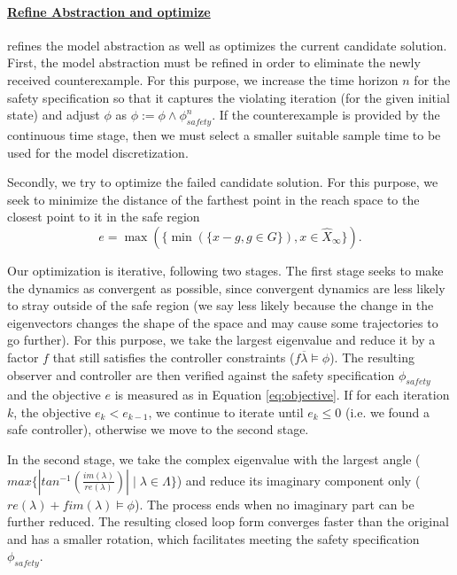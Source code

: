 \documentclass[sigconf]{llncs}
\renewcommand{\vec}[1]{{#1}}
\begin{document}
\paragraph{\underline{{\sc Refine Abstraction and optimize}}} refines the
model abstraction as well as optimizes the current candidate
solution.
%
First, the model abstraction must be refined in order to eliminate
the newly received counterexample. For this purpose,
we increase the time horizon $n$ for the
safety specification so that it captures the violating iteration
(for the given initial state) and adjust $\phi$ as 
$\phi := \phi \wedge \phi_\mathit{safety}^n$.
If the counterexample is provided by the {\sc continuous time} stage,
then we must select a smaller suitable sample time to be used
for the model discretization.


Secondly, we try to optimize the failed candidate solution.
For this purpose, we seek to minimize the distance of the farthest point in the
reach space to the closest point to it in the safe region
\begin{equation}
e = \max(\{\min(\{\vec{x}-\vec{g}, \vec{g}\in G\}), \vec{x} \in \hat{X}_\infty \}).
\label{eq:objective}
\end{equation}

Our optimization is iterative, following two stages.  The first stage
seeks to make the dynamics as convergent as possible, since convergent
dynamics are less likely to stray outside of the safe region (we say
less likely because the change in the eigenvectors changes the shape
of the space and may cause some trajectories to go further). For this
purpose, we take the largest eigenvalue and reduce it by a factor $f$
that still satisfies the controller constraints ($f \overline{\lambda}
\models \phi$).  The resulting observer and controller are then
verified against the safety specification $\phi_\mathit{safety}$ and the
objective $e$ is measured as in Equation \eqref{eq:objective}.   If for
each iteration $k$, the objective $e_k<e_{k-1}$, we continue to
iterate until $e_k \leq 0$ (i.e. we found a safe controller),
otherwise we move to the second stage.

In the second stage, we take the complex eigenvalue
with the largest angle ($max\{|tan^{-1}\left(\frac{im(\lambda)}{re(\lambda)}\right)| \mid \lambda \in \Lambda\}$)
and reduce its imaginary component only  ($re(\lambda) + f im(\lambda) \models \phi$).
The process ends when no imaginary part can be further reduced.
The resulting closed loop form converges faster than the original and has a
smaller rotation, which facilitates meeting the safety specification $\phi_\mathit{safety}$.
\end{document}
